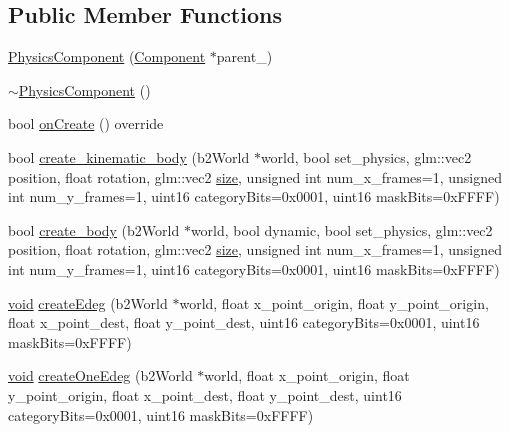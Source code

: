 \subsection*{Public Member Functions}
\begin{DoxyCompactItemize}
\item 
\hyperlink{classPhysicsComponent_ac017ab88e7bf394bb8adf393a523f796}{Physics\+Component} (\hyperlink{classComponent}{Component} $\ast$parent\+\_\+)
\item 
\hyperlink{classPhysicsComponent_ac77afe4cc81460ea6027e6c21739a4af}{$\sim$\+Physics\+Component} ()
\item 
bool \hyperlink{classPhysicsComponent_ad797a2708cfc3c0e88a44341121f594d}{on\+Create} () override
\item 
bool \hyperlink{classPhysicsComponent_a3103543ce56426e419481b02e2107009}{create\+\_\+kinematic\+\_\+body} (b2\+World $\ast$world, bool set\+\_\+physics, glm\+::vec2 position, float rotation, glm\+::vec2 \hyperlink{imgui__impl__opengl3__loader_8h_a3d1e3edfcf61ca2d831883e1afbad89e}{size}, unsigned int num\+\_\+x\+\_\+frames=1, unsigned int num\+\_\+y\+\_\+frames=1, uint16 category\+Bits=0x0001, uint16 mask\+Bits=0x\+F\+F\+F\+F)
\item 
bool \hyperlink{classPhysicsComponent_a0b7ab35e9b3edabf22c7e16b8494d5c2}{create\+\_\+body} (b2\+World $\ast$world, bool dynamic, bool set\+\_\+physics, glm\+::vec2 position, float rotation, glm\+::vec2 \hyperlink{imgui__impl__opengl3__loader_8h_a3d1e3edfcf61ca2d831883e1afbad89e}{size}, unsigned int num\+\_\+x\+\_\+frames=1, unsigned int num\+\_\+y\+\_\+frames=1, uint16 category\+Bits=0x0001, uint16 mask\+Bits=0x\+F\+F\+F\+F)
\item 
\hyperlink{imgui__impl__opengl3__loader_8h_ac668e7cffd9e2e9cfee428b9b2f34fa7}{void} \hyperlink{classPhysicsComponent_a1e3f0387d8beec67cd139c093b3d6548}{create\+Edeg} (b2\+World $\ast$world, float x\+\_\+point\+\_\+origin, float y\+\_\+point\+\_\+origin, float x\+\_\+point\+\_\+dest, float y\+\_\+point\+\_\+dest, uint16 category\+Bits=0x0001, uint16 mask\+Bits=0x\+F\+F\+F\+F)
\item 
\hyperlink{imgui__impl__opengl3__loader_8h_ac668e7cffd9e2e9cfee428b9b2f34fa7}{void} \hyperlink{classPhysicsComponent_a425b028e07ebe6629a5773658a75348a}{create\+One\+Edeg} (b2\+World $\ast$world, float x\+\_\+point\+\_\+origin, float y\+\_\+point\+\_\+origin, float x\+\_\+point\+\_\+dest, float y\+\_\+point\+\_\+dest, uint16 category\+Bits=0x0001, uint16 mask\+Bits=0x\+F\+F\+F\+F)
\item 

\end{DoxyCompactItemize}
